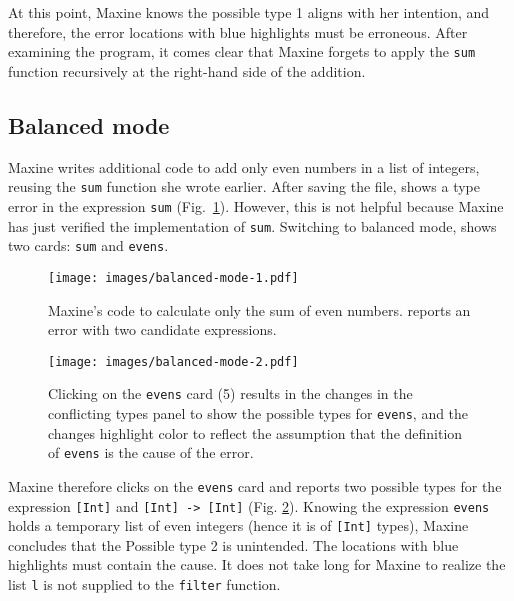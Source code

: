 At this point, Maxine knows the possible type 1 aligns with her intention, and therefore, the error locations with blue highlights must be erroneous. After examining the program, it comes clear that Maxine forgets to apply the \texttt{sum} function recursively at the right-hand side of the addition. 


\subsection{Balanced mode} \label{sub:balanced}


Maxine writes additional code to add only even numbers in a list of integers, reusing the \texttt{sum} function she wrote earlier. After saving the file, \chameleon{} shows a type error in the expression \texttt{sum} (Fig.~\ref{fig:balance-mode-1}). However, this is not helpful because Maxine has just verified the implementation of \texttt{sum}. Switching to balanced mode, \chameleon{} shows two cards: \texttt{sum} and \texttt{evens}. 

\begin{figure}
        \centering
        \texttt{[image: images/balanced-mode-1.pdf]}
        \caption{
            Maxine's code to calculate only the sum 
            of even numbers. \chameleon{} reports 
            an error with two candidate expressions.
        }
        \label{fig:balance-mode-1}
\end{figure}


\begin{figure}
   \centering
        \texttt{[image: images/balanced-mode-2.pdf]}
        \caption{
            Clicking on the \texttt{evens} card (5) results in the changes in the
            conflicting types panel to show the possible types for \texttt{evens},
            and the changes highlight color to reflect the assumption that the
            definition of \texttt{evens} is the cause of the error.  
        }
        \label{fig:balance-mode-2}
\end{figure}

Maxine therefore clicks on the \texttt{evens} card and \chameleon{} reports two
possible types for the expression \texttt{[Int]} and \texttt{[Int] -> [Int]}
(Fig. \ref{fig:balance-mode-2}). Knowing the expression \texttt{evens} holds
a temporary list of even integers (hence it is of \texttt{[Int]} types), Maxine
concludes that the Possible type 2 is unintended. The locations with blue highlights must
contain the cause. It does not take long for Maxine to realize the list 
\texttt{l} is not supplied to the \texttt{filter} function.



